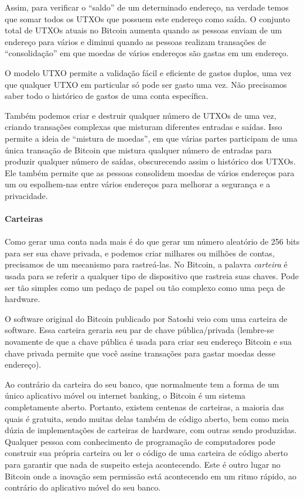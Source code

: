 Assim, para verificar o “saldo” de um determinado endereço, na verdade temos que somar todos os UTXOs que possuem este endereço como saída. O conjunto total de UTXOs atuais no Bitcoin aumenta quando as pessoas enviam de um endereço para vários e diminui quando as pessoas realizam transações de “consolidação” em que moedas de vários endereços são gastas em um endereço.

O modelo UTXO permite a validação fácil e eficiente de gastos duplos, uma vez que qualquer UTXO em particular só pode ser gasto uma vez. Não precisamos saber todo o histórico de gastos de uma conta específica.

Também podemos criar e destruir qualquer número de UTXOs de uma vez, criando transações complexas que misturam diferentes entradas e saídas. Isso permite a ideia de “mistura de moedas”, em que várias partes participam de uma única transação de Bitcoin que mistura qualquer número de entradas para produzir qualquer número de saídas, obscurecendo assim o histórico dos UTXOs. Ele também permite que as pessoas consolidem moedas de vários endereços para um ou espalhem-nas entre vários endereços para melhorar a segurança e a privacidade.
\newpage
\paragraph{Carteiras}
\paragraph{}

Como gerar uma conta nada mais é do que gerar um número aleatório de 256 bits para ser sua chave privada, e podemos criar milhares ou milhões de contas, precisamos de um mecanismo para rastreá-las. No Bitcoin, a palavra \textit{carteira} é usada para se referir a qualquer tipo de dispositivo que rastreia suas chaves. Pode ser tão simples como um pedaço de papel ou tão complexo como uma peça de hardware.

O software original do Bitcoin publicado por Satoshi veio com uma carteira de software. Essa carteira geraria seu par de chave pública/privada (lembre-se novamente de que a chave pública é usada para criar seu endereço Bitcoin e sua chave privada permite que você assine transações para gastar moedas desse endereço).

Ao contrário da carteira do seu banco, que normalmente tem a forma de um único aplicativo móvel ou internet banking, o Bitcoin é um sistema completamente aberto. Portanto, existem centenas de carteiras, a maioria das quais é gratuita, sendo muitas delas também de código aberto, bem como meia dúzia de implementações de carteiras de hardware, com outras sendo produzidas. Qualquer pessoa com conhecimento de programação de computadores pode construir sua própria carteira ou ler o código de uma carteira de código aberto para garantir que nada de suspeito esteja acontecendo. Este é outro lugar no Bitcoin onde a inovação sem permissão está acontecendo em um ritmo rápido, ao contrário do aplicativo móvel do seu banco.


